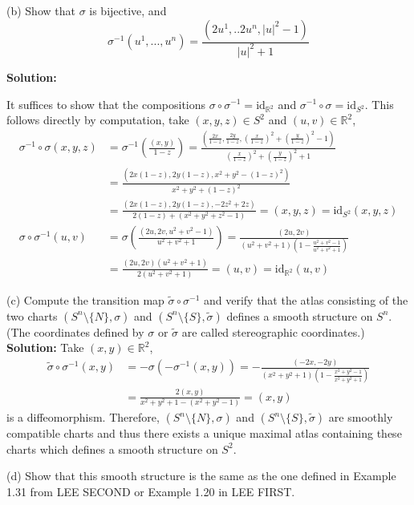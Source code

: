 \documentclass[12pt]{extarticle}
\newcommand{\R}{\mathbb{R}}
\newcommand{\invI}[2]{#1^{-1} \left( #2 \right)}
\newcommand{\id}{\mathrm{id}}
\begin{document}
\begin{enumerate}
(b) Show that  $\sigma$ is bijective, and
 \[
 \sigma^{-1}(u^1, ... ,u^n) =\frac{(2u^1,..2u^n, |u|^2 -1)}{|u|^2+1}
 \]

\textbf{Solution:}

It suffices to show that the compositions $\sigma \circ \sigma^{-1} = \id_{\R^2}$ and $\sigma^{-1} \circ \sigma = \id_{S^2}$. This follows directly by computation, take $(x,y,z) \in S^2$ and $(u, v) \in \R^2$,
\begin{align*}
\sigma^{-1}\circ \sigma(x,y,z) &= \sigma^{-1}  \left(\frac{(x,y)}{1-z}\right) = \frac{\left(\frac{2x}{1-z},\frac{2y}{1-z}, \left(\frac{x}{1-z}\right)^2+\left(\frac{y}{1-z}\right)^2 -1\right)}{\left(\frac{x}{1-z}\right)^2+\left(\frac{y}{1-z}\right)^2 +1}
\\
&=\frac{\left(2x(1-z),2y(1-z),x^2+y^2-(1-z)^2\right)}{x^2+y^2+(1-z)^2}
\\
&=\frac{\left(2x(1-z),2y(1-z),-2z^2+2z\right)}{2(1-z) + (x^2 + y^2 + z^2 - 1)} = \left(x, y, z\right) = \id_{S^2}(x, y, z)
\\
\sigma\circ \invI{\sigma}{u, v} &= \sigma\left(\frac{(2u,2v, u^2+v^2 -1)}{u^2 + v^2 + 1}\right) = \frac{(2u,2v)}{(u^2 + v^2 + 1)\left(1-\frac{u^2 + v^2 - 1}{u^2 + v^2 + 1}\right)}\\
&=\frac{(2u, 2v)(u^2 + v^2 + 1)}{2(u^2 + v^2 + 1)} = (u, v) = \id_{\R^2}(u, v)
\end{align*}

(c) Compute the transition map  $\widetilde{\sigma} \circ \sigma^{-1}$ and verify that the atlas consisting of the two charts $(S^n\setminus \{N\}, \sigma)$ and $(S^n\setminus \{S\}, \widetilde{\sigma})$ defines a smooth structure on $S^n$. (The coordinates defined by  $\sigma$ or $\tilde{\sigma}$ are called stereographic coordinates.) \\

\textbf{Solution:}
Take $(x, y) \in \R^2$,
\begin{align*}
\tilde{\sigma} \circ \sigma^{-1}(x, y) & = -\sigma(-\sigma^{-1}(x, y)) = -\frac{\left(-2x, -2y \right)}{(x^2+y^2 + 1) \left(1-\frac{x^2+y^2-1}{x^2+y^2+1} \right)} \\
&  = \frac{2(x,y)}{x^2+y^2+1-(x^2+y^2-1)} = (x,y)
\end{align*}
is a diffeomorphism. Therefore, $(S^n\setminus{\{N\}},\sigma)$ and $(S^n\setminus{\{S\}},\widetilde{\sigma})$ are smoothly compatible charts and thus there exists a unique maximal atlas containing these charts which defines a smooth structure on $S^2$. 

(d) Show that this smooth structure is the same as the one defined in Example 1.31 from LEE SECOND or Example 1.20 in LEE FIRST.


\end{enumerate}
\end{document}
